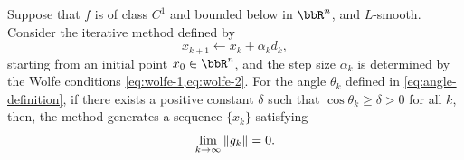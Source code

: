 \documentclass[en]{subfiles}
\begin{document}
\begin{theorem}
    \label{thm:line-search-global-convergence}
    Suppose that $f$ is of class $C^1$ and bounded below in $\bbR^n$, and $L$-smooth.
    Consider the iterative method defined by
    \begin{equation*}
        x_{k+1} \gets x_k + \alpha_k d_k,
    \end{equation*}
    starting from an initial point $x_0 \in \bbR^n$, and the step size $\alpha_k$ is determined by the Wolfe conditions \cref{eq:wolfe-1,eq:wolfe-2}.
    For the angle $\theta_k$ defined in \cref{eq:angle-definition}, if there exists a positive constant $\delta$ such that
    $\cos \theta_k \geq \delta > 0$ for all $k$,
    then, the method generates a sequence $\{x_k\}$ satisfying
    \begin{equation}\label{eq:gradient-convergence}
        \lim_{k \to \infty} \norm{g_k} = 0.
    \end{equation}
\end{theorem}
\end{document}
